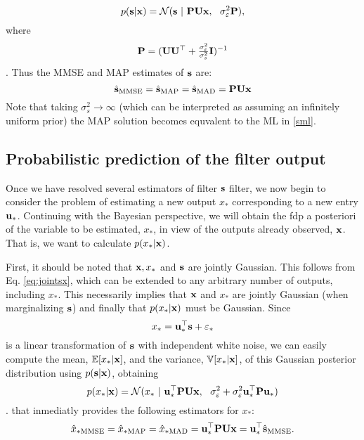 \begin{equation}
p({\mathbf s}|{\mathbf x}) = {\mathcal N}({\mathbf s}~|~ {\mathbf P} {\mathbf U} {\mathbf x},~~ \sigma_\varepsilon^2{\mathbf P}) ,
\end{equation}
where
\begin{align}
{\mathbf P} = ({\mathbf U}{\mathbf U}^\top  + \tfrac{\sigma_\varepsilon^2}{\sigma_s^2}{\mathbf I})^{-1}
\end{align}.
Thus the MMSE and MAP estimates of ${\mathbf s}$ are:
\begin{equation}
\hat{{\mathbf s}}_\text{MMSE} =\hat{{\mathbf s}}_\text{MAP} =\hat{{\mathbf s}}_\text{MAD} = {\mathbf P}  {\mathbf U} {\mathbf x}
\label{smmse}
\end{equation}
Note that taking $\sigma_s^2\rightarrow\infty$ (which can be interpreted as assuming an infinitely uniform prior) the MAP solution becomes equvalent to the ML in \eqref{sml}.


\subsection{Probabilistic prediction of the filter output}

Once we have resolved several estimators of filter ${\mathbf s}$ filter, we now begin to consider the problem of estimating a new output $x_*$ corresponding to a new entry $ {\mathbf u}_*$. Continuing with the Bayesian perspective, we will obtain the fdp a posteriori of the variable to be estimated, $x_*$, in view of the outputs already observed, ${\mathbf x}$. That is, we want to calculate $p (x_* | {\mathbf x})$.

First, it should be noted that ${\mathbf x}, x_*$ and ${\mathbf s}$ are jointly Gaussian. This follows from Eq. \eqref{eq:jointsx}, which can be extended to any arbitrary number of outputs, including $x_*$. This necessarily implies that ${\mathbf x}$ and $x_*$ are jointly Gaussian (when marginalizing ${\mathbf s}$) and finally that $p(x_* | {\mathbf x}) $ must be Gaussian. Since
\begin{equation}
x_* = {\mathbf u}_*^\top{\mathbf s}+\varepsilon_*
\end{equation}
is a linear transformation of ${\mathbf s}$ with independent white noise, we can easily compute the mean, $\mathbb{E}[x_*|{\mathbf x}]$, and the variance, $\mathbb{V}[x_*|{\mathbf x}]$, of this Gaussian posterior distribution using $p({\mathbf s}|{\mathbf x})$, obtaining
%
\begin{equation}
p(x_*|{\mathbf x}) = {\mathcal N}(x_*~|~ {\mathbf u}_*^\top{\mathbf P}  {\mathbf U} {\mathbf x},~~
                    \sigma_\varepsilon^2+\sigma_\varepsilon^2{\mathbf u}_*^\top{\mathbf P} {\mathbf u}_*)
\end{equation}.
that inmediatly provides the following estimators for $x_*$:
\begin{equation}
\hat{x}_{*\text{MMSE} } =\hat{x}_{*\text{MAP} } =\hat{x}_{*\text{MAD} }  =  {\mathbf u}_*^\top{\mathbf P}  {\mathbf U} {\mathbf x} = {\mathbf u}_*^\top\hat{{\mathbf s}}_\text{MMSE}.
\end{equation}

